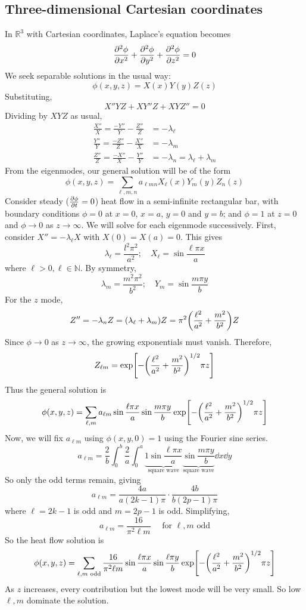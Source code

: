 \subsection{Three-dimensional Cartesian coordinates}
In \( \mathbb R^3 \) with Cartesian coordinates, Laplace's equation becomes
\[ \pdv[2]{\phi}{x} + \pdv[2]{\phi}{y} + \pdv[2]{\phi}{z} = 0 \]
We seek separable solutions in the usual way:
\[ \phi(x,y,z) = X(x)Y(y)Z(z) \]
Substituting,
\[ X''YZ + XY''Z + XYZ'' = 0 \]
Dividing by \( XYZ \) as usual,
\begin{align*}
    \frac{X''}{X} = \frac{-Y''}{Y} - \frac{Z''}{Z} &= -\lambda_\ell \\
    \frac{Y''}{Y} = \frac{-Z''}{Z} - \frac{X''}{X} &= -\lambda_m \\
    \frac{Z''}{Z} = \frac{-X''}{X} - \frac{Y''}{Y} &= -\lambda_n = \lambda_\ell + \lambda_m
\end{align*}
From the eigenmodes, our general solution will be of the form
\[ \phi(x,y,z) = \sum_{\ell,m,n} a_{\ell mn} X_\ell(x) Y_m(y) Z_n(z) \]
Consider steady (\(\pdv{\phi}{t} = 0 \)) heat flow in a semi-infinite rectangular bar, with boundary conditions \( \phi = 0 \) at \( x = 0 \), \( x = a \), \( y = 0 \) and \( y = b \); and \( \phi = 1 \) at \( z = 0 \) and \( \phi \to 0 \) as \( z \to \infty \).
We will solve for each eigenmode successively.
First, consider \( X'' = -\lambda_\ell X \) with \( X(0) = X(a) = 0 \).
This gives
\[ \lambda_\ell = \frac{l^2 \pi^2}{a^2};\quad X_\ell = \sin \frac{\ell \pi x}{a} \]
where \( \ell > 0, \ell \in \mathbb N \).
By symmetry,
\[ \lambda_m = \frac{m^2 \pi^2}{b^2};\quad Y_m = \sin \frac{m \pi y}{b} \]
For the \( z \) mode,
\[ Z'' = -\lambda_n Z = (\lambda_\ell + \lambda_m) Z = \pi^2\qty(\frac{\ell^2}{a^2} + \frac{m^2}{b^2}) Z \]
Since \( \phi \to 0 \) as \( z \to \infty \), the growing exponentials must vanish.
Therefore,
\[ Z_{\ell m} = \exp[-\qty(\frac{\ell^2}{a^2} + \frac{m^2}{b^2})^{1/2} \pi z] \]
Thus the general solution is
\[ \phi(x,y,z) = \sum_{\ell, m} a_{\ell m} \sin \frac{\ell \pi x}{a} \sin \frac{m \pi y}{b} \exp[-\qty(\frac{\ell^2}{a^2} + \frac{m^2}{b^2})^{1/2} \pi z] \]
Now, we will fix \( a_{\ell m} \) using \( \phi(x,y,0) = 1 \) using the Fourier sine series.
\[ a_{\ell m} = \frac{2}{b} \int_0^b \frac{2}{a} \int_0^a \underbrace{1 \sin \frac{\ell \pi x}{a}}_{\text{square wave}} \underbrace{\sin \frac{m \pi y}{b}}_{\text{square wave}} \dd{x} \dd{y} \]
So only the odd terms remain, giving
\[ a_{\ell m} = \frac{4a}{a(2k-1)\pi} \cdot \frac{4b}{b(2p-1) \pi} \]
where \( \ell = 2k-1 \) is odd and \( m = 2p-1 \) is odd.
Simplifying,
\[ a_{\ell m} = \frac{16}{\pi^2 \ell m} \quad \text{ for } \ell, m \text{ odd} \]
So the heat flow solution is
\[ \phi(x,y,z) = \sum_{\ell, m \text{ odd}} \frac{16}{\pi^2 \ell m} \sin \frac{\ell \pi x}{a} \sin \frac{\ell \pi y}{b} \exp[-\qty(\frac{\ell^2}{a^2} + \frac{m^2}{b^2})^{1/2} \pi z] \]
As \( z \) increases, every contribution but the lowest mode will be very small.
So low \( \ell, m \) dominate the solution.

